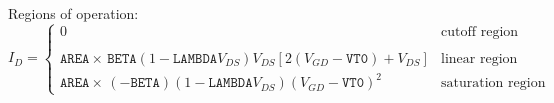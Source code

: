 \documentclass{article}
\begin{document}
\\

Regions of operation:
\newline
{}\\
\begin{equation}
I_{D} = \left\{ \begin{array}{ll}
      0  & \mbox{cutoff region} \\ \\
      \texttt{AREA}\times \,\texttt{BETA} \left(1 - \texttt{LAMBDA} V_{DS}\right)V_{DS}
      \left[2\left(V_{GD}- \texttt{VT0}\right)+V_{DS}\right]
         &\mbox{linear region}\\
      \texttt{AREA} \times \,(-\texttt{BETA}) \left(1 - \texttt{LAMBDA} V_{DS}\right)
      \left(V_{GD} - \texttt{VT0}\right)^2
         &\mbox{saturation region} \end{array} \right. %
\end{equation}\\
\end{document}
